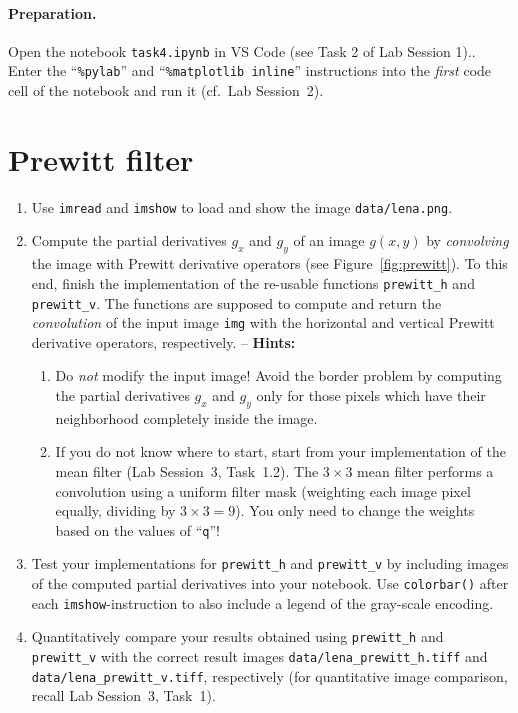 \documentclass[12pt,a4paper]{article}
\begin{document}
\paragraph{Preparation.} Open the notebook \texttt{task4.ipynb} in VS Code (see Task 2 of Lab Session 1).. Enter the ``\texttt{\%pylab}'' and ``\texttt{\%matplotlib inline}'' instructions into the \emph{first} code cell of the notebook and run it (cf.\ Lab Session~2).

\section{Prewitt filter}
\label{task:prewitt}
\begin{enumerate}
    \item Use \texttt{imread} and \texttt{imshow} to load and show the image \texttt{data/lena.png}.
    \item Compute the partial derivatives $g_x$ and $g_y$ of an image $g\left(x,y\right)$ by \emph{convolving} the image with Prewitt derivative operators (see Figure~\ref{fig:prewitt}). To this end, finish the implementation of the re-usable functions \texttt{prewitt\_h} and \texttt{prewitt\_v}. The functions are supposed to compute and return the \emph{convolution} of the input image \texttt{img} with the horizontal and vertical Prewitt derivative operators, respectively. -- \textbf{Hints:}
    \begin{enumerate}
        \item Do \emph{not} modify the input image! Avoid the border problem by computing the partial derivatives $g_x$ and $g_y$ only for those pixels which have their neighborhood completely inside the image.
        \item If you do not know where to start, start from your implementation of the mean filter (Lab Session~3, Task~1.2). The $3 \times 3$ mean filter performs a convolution using a uniform filter mask (weighting each image pixel equally, dividing by $3 \times 3 = 9$). You only need to change the weights based on the values of ``\texttt{q}''!
    \end{enumerate}
    \item Test your implementations for \texttt{prewitt\_h} and \texttt{prewitt\_v} by including images of the computed partial derivatives into your notebook. Use \texttt{colorbar()} after each \texttt{imshow}-instruction to also include a legend of the gray-scale encoding.
    \item Quantitatively compare your results obtained using \texttt{prewitt\_h} and \texttt{prewitt\_v} with the correct result images \texttt{data/lena\_prewitt\_h.tiff} and \texttt{data/lena\_\-prewitt\_\-v.tiff}, respectively (for quantitative image comparison, recall Lab Session~3, Task~1).
\end{enumerate}
\end{document}
